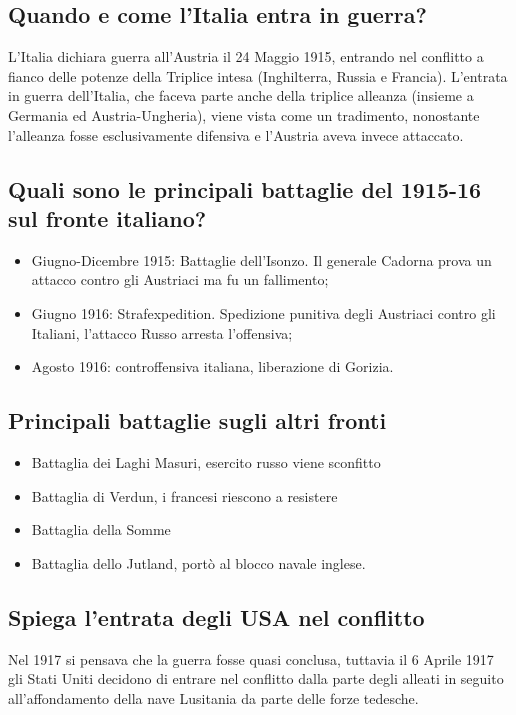 \documentclass{article}
\begin{document}
\subsection{Quando e come l'Italia entra in guerra?}
L'Italia dichiara guerra all'Austria il 24 Maggio 1915, entrando nel conflitto a fianco delle potenze della Triplice intesa
(Inghilterra, Russia e Francia). L'entrata in guerra dell'Italia, che faceva parte anche della triplice alleanza (insieme a
Germania ed Austria-Ungheria), viene vista come un tradimento, nonostante l'alleanza fosse esclusivamente difensiva e
l'Austria aveva invece attaccato.

\subsection{Quali sono le principali battaglie del 1915-16 sul fronte italiano?}
\begin{itemize}
    \item Giugno-Dicembre 1915: Battaglie dell'Isonzo. Il generale Cadorna prova un attacco contro gli Austriaci ma fu un fallimento;
    \item Giugno 1916: Strafexpedition. Spedizione punitiva degli Austriaci contro gli Italiani, l'attacco Russo arresta l'offensiva;
    \item Agosto 1916: controffensiva italiana, liberazione di Gorizia.
\end{itemize}

\subsection{Principali battaglie sugli altri fronti}
\begin{itemize}
    \item Battaglia dei Laghi Masuri, esercito russo viene sconfitto
    \item Battaglia di Verdun, i francesi riescono a resistere
    \item Battaglia della Somme
    \item Battaglia dello Jutland, portò al blocco navale inglese.
\end{itemize}

\subsection{Spiega l'entrata degli USA nel conflitto}
Nel 1917 si pensava che la guerra fosse quasi conclusa, tuttavia il 6 Aprile 1917 gli Stati Uniti decidono di entrare nel
conflitto dalla parte degli alleati in seguito all'affondamento della nave Lusitania da parte delle forze tedesche.
\end{document}
